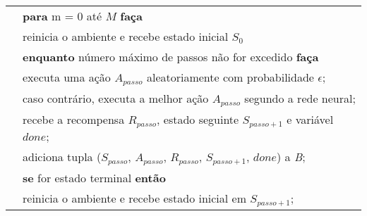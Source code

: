 \begin{tabular}{l l}
 & \textbf{para} m = 0 até $M$ \textbf{faça}\\
 & \qquad reinicia o ambiente e recebe estado inicial $S_{0}$\\
 & \qquad \textbf{enquanto} número máximo de passos não for excedido \textbf{faça}\\
 & \qquad \qquad executa uma ação $A_{passo}$ aleatoriamente com probabilidade $\epsilon$;\\
 & \qquad \qquad caso contrário, executa a melhor ação $A_{passo}$ segundo a rede neural;\\
 & \qquad \qquad recebe a recompensa $R_{passo}$, estado seguinte $S_{passo+1}$ e variável $done$;\\
 & \qquad \qquad adiciona tupla ($S_{passo}$, $A_{passo}$, $R_{passo}$, $S_{passo+1}$, $done$) a \textit{B};\\
 & \qquad \qquad \textbf{se} for estado terminal \textbf{então}\\
 & \qquad \qquad \qquad reinicia o ambiente e recebe estado inicial em $S_{passo+1}$;\\

\end{tabular}
